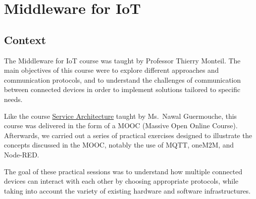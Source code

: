 


\section{Middleware for IoT}
\subsection{Context}
The Middleware for IoT course was taught by Professor Thierry Monteil. The main objectives of this course were to explore different approaches and communication protocols, and to understand the challenges of communication between connected devices in order to implement solutions tailored to specific needs.

Like the course \hyperref[sec:service_architecture]{Service Architecture} taught by Ms.\ Nawal Guermouche, this course was delivered in the form of a MOOC (Massive Open Online Course). Afterwards, we carried out a series of practical exercises designed to illustrate the concepts discussed in the MOOC, notably the use of MQTT, oneM2M, and Node-RED.

The goal of these practical sessions was to understand how multiple connected devices can interact with each other by choosing appropriate protocols, while taking into account the variety of existing hardware and software infrastructures.

